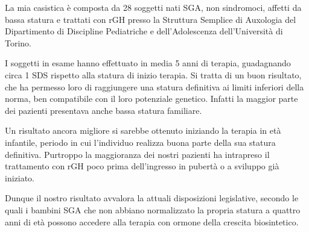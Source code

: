 \documentclass[12pt,a4paper]{article}
\begin{document}
La mia casistica è composta da 28 soggetti nati SGA, non sindromoci, affetti da bassa statura e trattati con rGH presso la Struttura Semplice di Auxologia del Dipartimento di Discipline Pediatriche e dell'Adolescenza dell'Università di Torino.

I soggetti in esame hanno effettuato in media 5 anni di terapia, guadagnando circa 1 SDS rispetto alla statura di inizio terapia. Si tratta di un buon risultato, che ha permesso loro di raggiungere una statura definitiva ai limiti inferiori della norma, ben compatibile con il loro potenziale genetico. Infatti la maggior parte dei pazienti presentava anche bassa statura familiare. 

Un risultato ancora migliore si sarebbe ottenuto iniziando la terapia in età infantile, periodo in cui l'individuo realizza buona parte della sua statura definitiva. Purtroppo la maggioranza dei nostri pazienti ha intrapreso il trattamento con rGH poco prima dell'ingresso in pubertà o a sviluppo già iniziato.

Dunque il nostro risultato avvalora la attuali disposizioni legislative, secondo le quali i bambini SGA che non abbiano normalizzato la propria statura a quattro anni di età possono accedere alla terapia con ormone della crescita biosintetico.  



 
\end{document}
